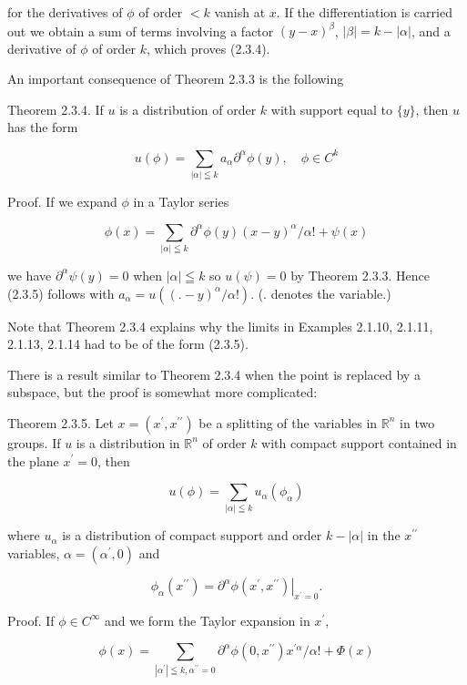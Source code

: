 for the derivatives of $\phi$ of order $<k$ vanish at $x$. If the differentiation is carried out we obtain a sum of terms involving a factor $(y-x)^{\beta}$, $|\beta|=k-|\alpha|$, and a derivative of $\phi$ of order $k$, which proves (2.3.4).

An important consequence of Theorem 2.3.3 is the following

Theorem 2.3.4. If $u$ is a distribution of order $k$ with support equal to $\{y\}$, then $u$ has the form

\[
u(\phi)=\sum_{|\alpha| \leqq k} a_{\alpha} \partial^{\alpha} \phi(y), \quad \phi \in C^{k}
\]

Proof. If we expand $\phi$ in a Taylor series

\[
\phi(x)=\sum_{|\alpha| \leqq k} \partial^{\alpha} \phi(y)(x-y)^{\alpha} / \alpha !+\psi(x)
\]

we have $\partial^{\alpha} \psi(y)=0$ when $|\alpha| \leqq k$ so $u(\psi)=0$ by Theorem 2.3.3. Hence (2.3.5) follows with $a_{\alpha}=u\left((.-y)^{\alpha} / \alpha !\right)$. (. denotes the variable.)

Note that Theorem 2.3.4 explains why the limits in Examples 2.1.10, 2.1.11, 2.1.13, 2.1.14 had to be of the form (2.3.5).

There is a result similar to Theorem 2.3.4 when the point is replaced by a subspace, but the proof is somewhat more complicated:

Theorem 2.3.5. Let $x=\left(x^{\prime}, x^{\prime \prime}\right)$ be a splitting of the variables in $\mathbb{R}^{n}$ in two groups. If $u$ is a distribution in $\mathbb{R}^{n}$ of order $k$ with compact support contained in the plane $x^{\prime}=0$, then


\begin{equation*}
u(\phi)=\sum_{|\alpha| \leqq k} u_{\alpha}\left(\phi_{\alpha}\right) \tag{2.3.6}
\end{equation*}


where $u_{\alpha}$ is a distribution of compact support and order $k-|\alpha|$ in the $x^{\prime \prime}$ variables, $\alpha=\left(\alpha^{\prime}, 0\right)$ and

\[
\phi_{\alpha}\left(x^{\prime \prime}\right)=\left.\partial^{\alpha} \phi\left(x^{\prime}, x^{\prime \prime}\right)\right|_{x^{\prime}=0} .
\]

Proof. If $\phi \in C^{\infty}$ and we form the Taylor expansion in $x^{\prime}$,

\[
\phi(x)=\sum_{\left|\alpha^{\prime}\right| \leqq k, \alpha^{\prime \prime}=0} \partial^{\alpha} \phi\left(0, x^{\prime \prime}\right) x^{\prime \alpha} / \alpha !+\Phi(x)
\]

